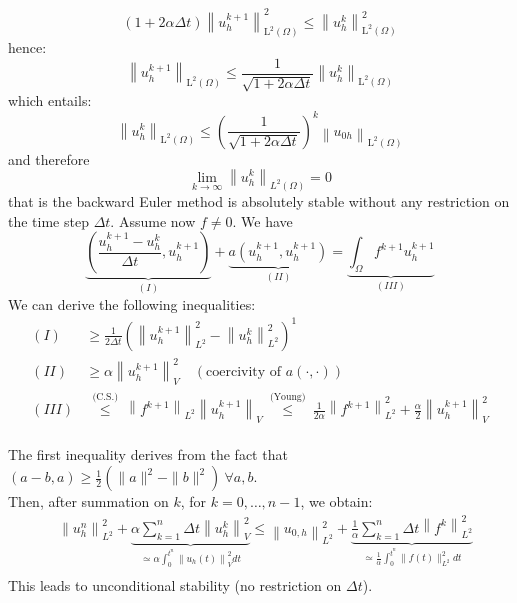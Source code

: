 \documentclass[11pt]{book}
\begin{document}
\begin{equation}
(1+2 \alpha \Delta t)\left\|u_{h}^{k+1}\right\|_{\mathrm{L}^{2}(\Omega)}^{2} \leq\left\|u_{h}^{k}\right\|_{\mathrm{L}^{2}(\Omega)}^{2}
\end{equation}
hence:
\begin{equation}
\left\|u_{h}^{k+1}\right\|_{\mathrm{L}^{2}(\Omega)} \leq \frac{1}{\sqrt{1+2 \alpha \Delta t}}\left\|u_{h}^{k}\right\|_{\mathrm{L}^{2}(\Omega)}
\end{equation}
which entails:
\begin{equation}
\left\|u_{h}^{k}\right\|_{\mathrm{L}^{2}(\Omega)} \leq\left(\frac{1}{\sqrt{1+2 \alpha \Delta t}}\right)^{k}\left\|u_{0 h}\right\|_{\mathrm{L}^{2}(\Omega)}
\end{equation}
and therefore
\begin{equation}
\lim _{k \rightarrow \infty}\left\|u_{h}^{k}\right\|_{L^{2}(\Omega)}=0
\end{equation}
that is the backward Euler method is absolutely stable without any restriction on the time step $\Delta t$.
Assume now $f \neq 0$. We have
\begin{equation}
\underbrace{\left(\frac{u_{h}^{k+1}-u_{h}^{k}}{\Delta t}, u_{h}^{k+1}\right)}_{(I)}+\underbrace{a\left(u_{h}^{k+1}, u_{h}^{k+1}\right)}_{(II)}=\underbrace{\int_{\Omega} f^{k+1} u_{h}^{k+1}}_{(III)}
\end{equation}
We can derive the following inequalities:
\begin{align}
(I) & \geq \frac{1}{2 \Delta t}\left(\left\|u_{h}^{k+1}\right\|_{L^{2}}^{2}-\left\|u_{h}^{k}\right\|_{L^{2}}^{2}\right)^{1} \\
(II) & \geq \alpha\left\|u_{h}^{k+1}\right\|_{V}^{2} \quad(\text {coercivity of } a(\cdot, \cdot)) \\
(III) & \stackrel{\text { (C.S.) }}{\leq}\left\|f^{k+1}\right\|_{L^{2}}\left\|u_{h}^{k+1}\right\|_{V} \stackrel{\text { (Young) }}{\leq} \frac{1}{2 \alpha}\left\|f^{k+1}\right\|_{L^{2}}^{2}+\frac{\alpha}{2}\left\|u_{h}^{k+1}\right\|_{V}^{2}
\end{align}\\
The first inequality derives from the fact that $(a-b, a) \geq \frac{1}{2}\left(\|a\|^{2}-\|b\|^{2}\right) \ \forall a, b$. \\ 
Then, after summation on $k$, for $k=0, \ldots, n-1$, we obtain:
\begin{equation}
\begin{aligned}
& \left\|u_{h}^{n}\right\|_{L^{2}}^{2}+ \underbrace{\alpha \sum_{k=1}^{n} \Delta t\left\|u_{h}^{k}\right\|_{V}^{2}}_{\simeq \alpha \int_{0}^{t^{n}}\left\|u_{h}(t)\right\|_{V}^{2} d t} \leq\left\|u_{0, h}\right\|_{L^{2}}^{2}+\underbrace{\frac{1}{\alpha} \sum_{k=1}^{n} \Delta t\left\|f^{k}\right\|_{L^{2}}^{2}}_{\simeq \frac{1}{\alpha} \int_{0}^{t^{n}}\|f(t)\|_{L^{2}}^{2} d t} \\
\end{aligned}
\end{equation}
This leads to unconditional stability (no restriction on $\Delta t$).
\end{document}

